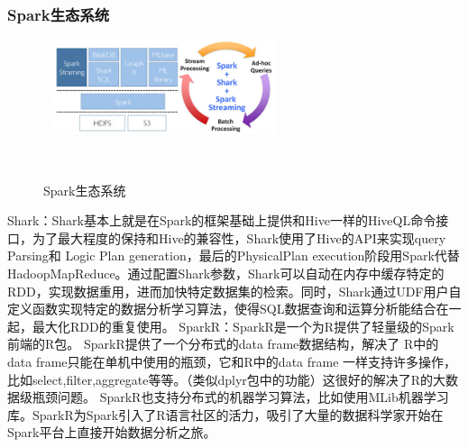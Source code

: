     \subsubsection{Spark生态系统}
    \begin{figure}[htbp]
    \centering 
    \includegraphics[width=6.5cm]{pic/spark_ecosystem.jpg} 
    \caption{Spark生态系统} \label{fig:spark_ecosystem} 
    \end{figure}
    Shark：Shark基本上就是在Spark的框架基础上提供和Hive一样的HiveQL命令接口，为了最大程度的保持和Hive的兼容性，Shark使用了Hive的API来实现query Parsing和 Logic Plan generation，最后的PhysicalPlan execution阶段用Spark代替HadoopMapReduce。通过配置Shark参数，Shark可以自动在内存中缓存特定的RDD，实现数据重用，进而加快特定数据集的检索。同时，Shark通过UDF用户自定义函数实现特定的数据分析学习算法，使得SQL数据查询和运算分析能结合在一起，最大化RDD的重复使用。
    SparkR：SparkR是一个为R提供了轻量级的Spark前端的R包。 SparkR提供了一个分布式的data frame数据结构，解决了 R中的data frame只能在单机中使用的瓶颈，它和R中的data frame 一样支持许多操作，比如select,filter,aggregate等等。（类似dplyr包中的功能）这很好的解决了R的大数据级瓶颈问题。 SparkR也支持分布式的机器学习算法，比如使用MLib机器学习库。SparkR为Spark引入了R语言社区的活力，吸引了大量的数据科学家开始在Spark平台上直接开始数据分析之旅。
  
\ifx\usechapbib\empty
\nocite{BSTcontrol}
\setcounter{NAT@ctr}{0}


\fi

